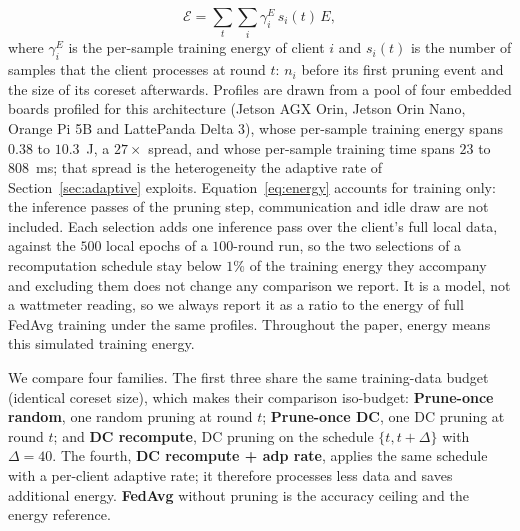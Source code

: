 \documentclass[conference]{IEEEtran}
\begin{document}
\begin{equation}
\mathcal{E} = \sum_{t} \sum_{i} \gamma^{E}_i \, s_i(t) \, E ,
\label{eq:energy}
\end{equation}
where $\gamma^{E}_i$ is the per-sample training energy of client $i$ and $s_i(t)$ is
the number of samples that the client processes at round $t$: $n_i$ before its first
pruning event and the size of its coreset afterwards. Profiles are drawn from a pool
of four embedded boards profiled for this architecture (Jetson AGX Orin, Jetson Orin
Nano, Orange Pi 5B and LattePanda Delta 3), whose per-sample training energy spans
$0.38$ to $10.3$~J, a $27\times$ spread, and whose per-sample training time spans $23$
to $808$~ms; that spread is the heterogeneity the adaptive rate of
Section~\ref{sec:adaptive} exploits. Equation~\eqref{eq:energy} accounts for training
only: the inference passes of the pruning step, communication and idle draw are not
included. Each selection adds one inference pass over the client's full local data,
against the $500$ local epochs of a $100$-round run, so the two selections of a
recomputation schedule stay below $1\%$ of the training energy they accompany and
excluding them does not change any comparison we report. It is a model, not a
wattmeter reading, so we always report it as a ratio to
the energy of full FedAvg training under the same profiles. Throughout the paper,
energy means this simulated training energy.

We compare four families. The first three share the same training-data budget (identical
coreset size), which makes their comparison iso-budget: \textbf{Prune-once random},
one random pruning at round $t$; \textbf{Prune-once DC}, one DC pruning at round $t$; and
\textbf{DC recompute}, DC pruning on the schedule $\{t, t+\Delta\}$ with $\Delta = 40$. The fourth,
\textbf{DC recompute + adp rate}, applies the same schedule with a per-client
adaptive rate; it therefore processes less data and saves additional energy.
\textbf{FedAvg} without pruning is the accuracy ceiling and the energy reference.
\end{document}
